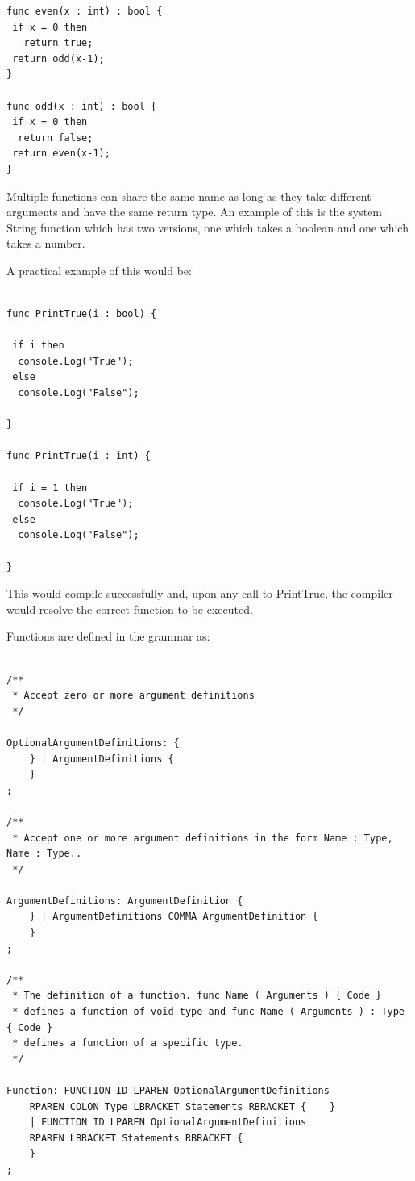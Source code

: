 \documentclass[]{final_report}
\begin{document}
\begin{verbatim}
func even(x : int) : bool {
 if x = 0 then 
   return true;
 return odd(x-1);
}

func odd(x : int) : bool {
 if x = 0 then 
  return false;
 return even(x-1);
}
\end{verbatim}

Multiple functions can share the same name as long as they take different arguments and have the same return type. An example of this is the system String function which has two versions, one which takes a boolean and one which takes a number.

A practical example of this would be:

\begin{verbatim}

func PrintTrue(i : bool) {

 if i then 
  console.Log("True"); 
 else 
  console.Log("False");

}

func PrintTrue(i : int) {

 if i = 1 then
  console.Log("True");
 else
  console.Log("False");

}

\end{verbatim}

This would compile successfully and, upon any call to PrintTrue, the compiler would resolve the correct function to be executed.

Functions are defined in the grammar as:

\begin{verbatim}

/**
 * Accept zero or more argument definitions
 */

OptionalArgumentDefinitions: {
	} | ArgumentDefinitions {
	}
;

/**
 * Accept one or more argument definitions in the form Name : Type, Name : Type..
 */

ArgumentDefinitions: ArgumentDefinition {
	} | ArgumentDefinitions COMMA ArgumentDefinition {
	}
;

/**
 * The definition of a function. func Name ( Arguments ) { Code } 
 * defines a function of void type and func Name ( Arguments ) : Type { Code }
 * defines a function of a specific type.
 */

Function: FUNCTION ID LPAREN OptionalArgumentDefinitions 
	RPAREN COLON Type LBRACKET Statements RBRACKET { 	} 
	| FUNCTION ID LPAREN OptionalArgumentDefinitions 
	RPAREN LBRACKET Statements RBRACKET {
	}
;
\end{verbatim}
\end{document}
